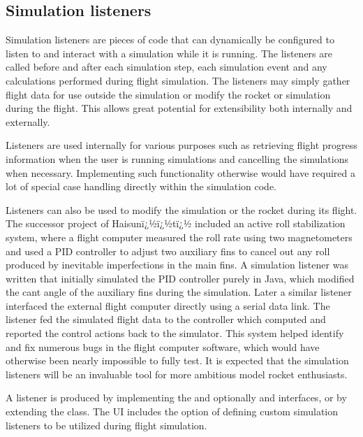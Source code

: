 \subsection{Simulation listeners}
\label{sec-listeners}

Simulation listeners are pieces of code that can dynamically be
configured to listen to and interact with a simulation while it is
running.  The listeners are called before and after each simulation
step, each simulation event and any calculations performed during
flight simulation.  The listeners may simply gather flight data for
use outside the simulation or modify the rocket or simulation during
the flight.  This allows great potential for extensibility both
internally and externally.

Listeners are used internally for various purposes such as retrieving
flight progress information when the user is running simulations and
cancelling the simulations when necessary.  Implementing such
functionality otherwise would have required a lot of special case
handling directly within the simulation code.

Listeners can also be used to modify the simulation or the rocket
during its flight.  The successor project of Haisunï¿½ï¿½tï¿½ included
an active roll stabilization system, where a flight computer 
measured the roll rate using two magnetometers and used a PID controller
to adjust two auxiliary fins to cancel out any roll produced by
inevitable imperfections in the main fins.  A simulation listener was
written that initially simulated the PID controller purely in Java, which
modified the cant angle of the auxiliary fins during the simulation.
Later a similar listener interfaced the external flight computer
directly using a serial data link.  The listener fed the simulated
flight data to the controller which computed and reported the control
actions back to the simulator.  This system helped identify and fix
numerous bugs in the flight computer software, which would have
otherwise been nearly impossible to fully test.  It is expected that
the simulation listeners will be an invaluable tool for more ambitious
model rocket enthusiasts.

A listener is produced by implementing the 
and optionally  and
 interfaces, or by extending
the  class.  The UI includes the
option of defining custom simulation listeners to be utilized during
flight simulation.


